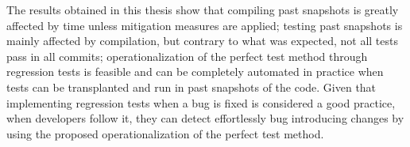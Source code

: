 The results obtained in this thesis show that compiling past snapshots is greatly affected by time unless mitigation measures are applied; 
testing past snapshots is mainly affected by compilation, but contrary to what was expected, not all tests pass in all commits;
operationalization of the perfect test method through regression tests is feasible and can be completely automated in practice when tests can be transplanted and run in past snapshots of the code.
Given that implementing regression tests when a bug is fixed is considered a good practice, when developers follow it, they can detect effortlessly bug introducing changes by using the proposed operationalization of the perfect test method.



